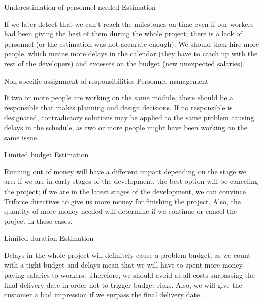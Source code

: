 \begin{risk}{Underestimation of personnel needed}
\riskcat Estimation

If we later detect that we can't reach the milestones on time even if our workers had been giving the best of them during the whole project; there is a lack of personnel (or the estimation was not accurate enough). We should then hire more people, which means more delays in the calendar (they have to catch up with the rest of the developers) and excesses on the budget (new unexpected salaries).
\end{risk}

\begin{risk}{Non-specific assignment of responsibilities}
\riskcat Personnel management

If two or more people are working on the same module, there should be a responsible that makes planning and design decisions. If no responsible is designated, contradictory solutions may be applied to the same problem causing delays in the schedule, as two or more people might have been working on the same issue.
\end{risk}

\begin{risk}{Limited budget}
\riskcat Estimation

Running out of money will have a different impact depending on the stage we are: if we are in early stages of the development, the best option will be canceling the project; if we are in the latest stages of the development, we can convince Triforce directives to give us more money for finishing the project. Also, the quantity of more money needed will determine if we continue or cancel the project in these cases.
\end{risk}

\begin{risk}{Limited duration}
\riskcat Estimation

Delays in the whole project will definitely cause a problem budget, as we count with a tight budget and delays mean that we will have to spent more money paying salaries to workers. Therefore, we should avoid at all costs surpassing the final delivery date in order not to trigger budget risks. Also, we will give the customer a bad impression if we surpass the final delivery date.
\end{risk}
